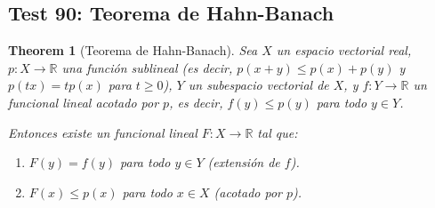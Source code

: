\documentclass[11pt,a4paper]{article}
\theoremstyle{plain}
\newtheorem{theorem}{Theorem}[section]
\theoremstyle{definition}
\begin{document}
\subsection{Test 90: Teorema de Hahn-Banach}

\begin{theorem}[Teorema de Hahn-Banach]
Sea $X$ un espacio vectorial real, $p: X \to \mathbb{R}$ una función sublineal (es decir, $p(x+y) \leq p(x) + p(y)$ y $p(tx) = tp(x)$ para $t \geq 0$), $Y$ un subespacio vectorial de $X$, y $f: Y \to \mathbb{R}$ un funcional lineal acotado por $p$, es decir, $f(y) \leq p(y)$ para todo $y \in Y$.

Entonces existe un funcional lineal $F: X \to \mathbb{R}$ tal que:
\begin{enumerate}
    \item $F(y) = f(y)$ para todo $y \in Y$ (extensión de $f$).
    \item $F(x) \leq p(x)$ para todo $x \in X$ (acotado por $p$).
\end{enumerate}
\end{theorem}
\end{document}

